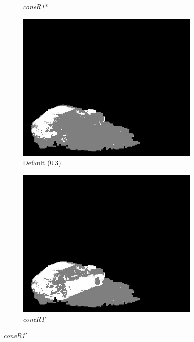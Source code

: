 \documentclass[12pt]{report}
\begin{document}
\begin{figure}
\begin{subfigure}{.24\linewidth}
  \caption{\textit{coneR1}*}
  \end{subfigure}
  \hfill
  \begin{subfigure}{.24\linewidth}
  \includegraphics[width=1\linewidth]{figures/model/campus_0061_default.jpg}
  \caption{Default (0.3)}
  \end{subfigure}
  \hfill
  \begin{subfigure}{.24\linewidth}
  \includegraphics[width=1\linewidth]{figures/model/campus_0061_calc.jpg}
  \caption{\textit{coneR1}$'$}
  \end{subfigure}

\end{figure}
\end{document}
